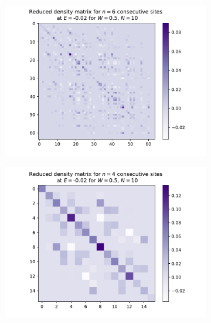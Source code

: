 \documentclass[reprint,amsmath,amssymb,aps,prb]{revtex4-2}
\begin{document}
\begin{center}
	\begin{figure}[h!]
		\begin{subfigure}[c]{0.45\textwidth}
			\includegraphics[width=\linewidth]{../results/groundstates/N10n6_trainingset_groundstate_Wmax0.5}
		\end{subfigure}
		\begin{subfigure}[c]{0.45\textwidth}
			\includegraphics[width=\linewidth]{../results/groundstates/N10n4_trainingset_groundstate_Wmax0.5}

\end{subfigure}
\end{figure}
\end{center}
\end{document}
